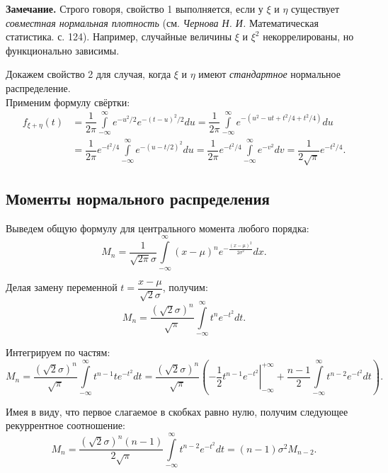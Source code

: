 \documentclass[11pt,a4paper]{article}
\begin{document}
\textbf{Замечание.} Строго говоря, свойство 1 выполняется, если у
\(\xi\) и \(\eta\) существует \emph{совместная нормальная плотность}
(см. \emph{Чернова Н. И.} Математическая статистика. с. 124). Например,
случайные величины \(\xi\) и \(\xi^2\) некоррелированы, но функционально
зависимы.

    Докажем свойство 2 для случая, когда \(\xi\) и \(\eta\) имеют
\emph{стандартное} нормальное распределение.\\
Применим формулу свёртки:
\begin{align*}
  f_{\xi+\eta}(t)
  &= \dfrac{1}{2\pi} \int\limits_{-\infty}^{\infty} e^{-{u^2}/{2}} e^{-{(t-u)^2}/{2}} du
  = \dfrac{1}{2\pi} \int\limits_{-\infty}^{\infty} e^{-\left( u^2 - ut + t^2/4 + t^2/4 \right)} du \\
  &= \dfrac{1}{2\pi} e^{-t^2/4} \int\limits_{-\infty}^{\infty} e^{-\left( u - t/2 \right)^2} du
  = \dfrac{1}{2\pi} e^{-t^2/4} \int\limits_{-\infty}^{\infty} e^{-v^2}dv
  = \dfrac{1}{2\sqrt{\pi}} e^{-t^2/4}.
\end{align*}

    \hypertarget{ux43cux43eux43cux435ux43dux442ux44b-ux43dux43eux440ux43cux430ux43bux44cux43dux43eux433ux43e-ux440ux430ux441ux43fux440ux435ux434ux435ux43bux435ux43dux438ux44f}{%
\subsection{Моменты нормального
распределения}\label{ux43cux43eux43cux435ux43dux442ux44b-ux43dux43eux440ux43cux430ux43bux44cux43dux43eux433ux43e-ux440ux430ux441ux43fux440ux435ux434ux435ux43bux435ux43dux438ux44f}}

Выведем общую формулу для центрального момента любого порядка:
\[
  M_n = \dfrac{1}{\sqrt{2\pi}\sigma} \int\limits_{-\infty}^{\infty}(x-\mu)^n e^{-\frac{(x-\mu)^2}{2\sigma^2}}dx.
\]

Делая замену переменной \(t = \dfrac{x-\mu}{\sqrt{2}\sigma}\), получим:
\[
  M_n = \dfrac{(\sqrt{2}\sigma)^n}{\sqrt{\pi}} \int\limits_{-\infty}^{\infty}t^n e^{-t^2}dt.
\]

Интегрируем по частям:
\[
  M_n = \dfrac{(\sqrt{2}\sigma)^n}{\sqrt{\pi}} \int\limits_{-\infty}^{\infty}t^{n-1}t e^{-t^2}dt
  = \dfrac{(\sqrt{2}\sigma)^n}{\sqrt{\pi}} \left( \left.-\dfrac{1}{2}t^{n-1}e^{-t^2} \right|_{-\infty}^{+\infty}
  + \dfrac{n-1}{2} \int\limits_{-\infty}^{\infty}t^{n-2} e^{-t^2}dt \right).
\]

Имея в виду, что первое слагаемое в скобках равно нулю, получим
следующее рекуррентное соотношение:
\[
  M_n = \dfrac{(\sqrt{2}\sigma)^n (n-1)}{2\sqrt{\pi}} \int\limits_{-\infty}^{\infty}t^{n-2} e^{-t^2}dt 
  = (n-1) \sigma^2 M_{n-2}.
\]
\end{document}
